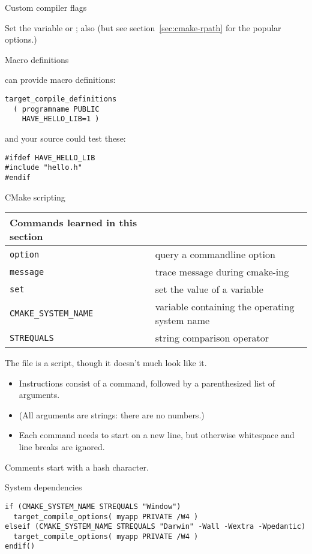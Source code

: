  {Custom compiler flags}

Set the variable
or
;
also
(but see section~\ref{sec:cmake-rpath}
for the popular  options.)

 {Macro definitions}

 can provide macro definitions:
\begin{lstlisting}
target_compile_definitions
  ( programname PUBLIC
    HAVE_HELLO_LIB=1 )
\end{lstlisting}
and your source could test these:
\lstset{language=C}
\begin{lstlisting}
#ifdef HAVE_HELLO_LIB
#include "hello.h"
#endif
\end{lstlisting}
\lstset{language=CMake}

 {CMake scripting}
\label{sec:cmake-script}

\begin{tabular}{lp{3in}}
  \toprule
  Commands learned in this section\\
  \midrule
  \lstinline+option+&query a commandline option\\
  \lstinline+message+&trace message during cmake-ing\\
  \lstinline+set+&set the value of a variable\\
  \lstinline+CMAKE_SYSTEM_NAME+&variable containing the operating system name\\
  \lstinline+STREQUALS+&string comparison operator\\
  \bottomrule
\end{tabular}

The  file is a script,
though it doesn't much look like it.
\begin{itemize}
\item
  Instructions consist of a command, followed by a parenthesized
  list of arguments.
\item
  (All arguments are strings: there are no numbers.)
\item
  Each command needs to start on a new line, but otherwise
  whitespace and line breaks are ignored.
\end{itemize}

Comments start with a hash character.

 {System dependencies}

\begin{lstlisting}
if (CMAKE_SYSTEM_NAME STREQUALS "Window")
  target_compile_options( myapp PRIVATE /W4 )
elseif (CMAKE_SYSTEM_NAME STREQUALS "Darwin" -Wall -Wextra -Wpedantic)
  target_compile_options( myapp PRIVATE /W4 )
endif()
\end{lstlisting}

